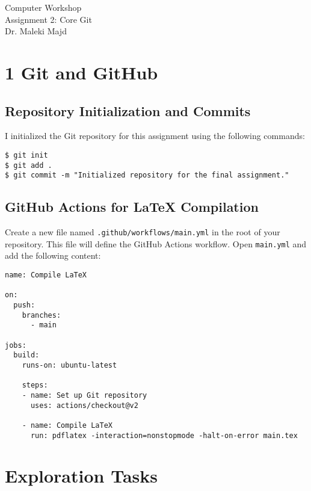 \documentclass{article}
\begin{document}
\begin{titlepage}
    \centering
    \vspace*{\fill}
    \large{Computer Workshop \\
Assignment 2: Core Git} \\

    \normalsize{Dr. Maleki Majd}
    \vspace*{\fill}
    \thispagestyle{empty}
\end{titlepage}



\tableofcontents
\clearpage

\section{1 Git and GitHub}
\subsection{ Repository Initialization and Commits}
I initialized the Git repository for this assignment using the following commands:
\begin{verbatim}
$ git init
$ git add .
$ git commit -m "Initialized repository for the final assignment."
\end{verbatim}

\subsection{GitHub Actions for LaTeX Compilation}
Create a new file named \texttt{.github/workflows/main.yml} in the root of your repository. This file will define the GitHub Actions workflow.
Open \texttt{main.yml} and add the following content:

\begin{verbatim}
name: Compile LaTeX

on:
  push:
    branches:
      - main

jobs:
  build:
    runs-on: ubuntu-latest

    steps:
    - name: Set up Git repository
      uses: actions/checkout@v2

    - name: Compile LaTeX
      run: pdflatex -interaction=nonstopmode -halt-on-error main.tex
\end{verbatim}

\section{Exploration Tasks}
\end{document}

